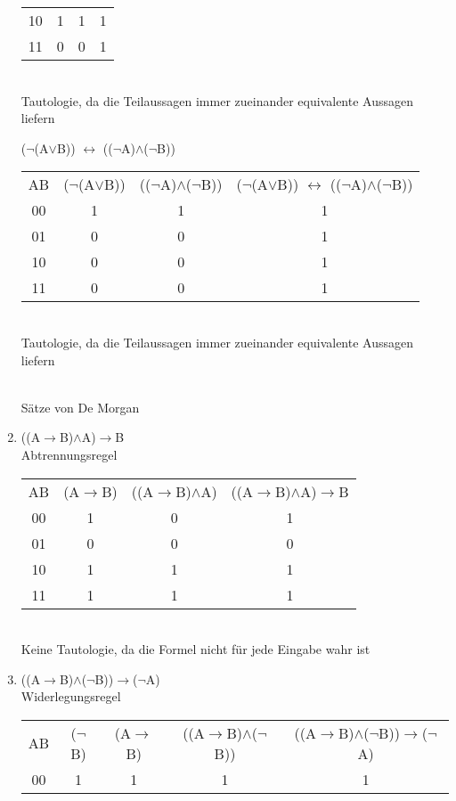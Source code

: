 \begin{enumerate}
{\begin{tabular}{cccc}
            10 & 1 & 1 & 1 \\
            11 & 0 & 0 & 1 \\
        \end{tabular}
        \\
        Tautologie, da die Teilaussagen immer zueinander equivalente Aussagen liefern\\
        }
        ($\neg$(A$\vee$B)) $\leftrightarrow$ (($\neg$A)$\wedge$($\neg$B)) \\
        {\tiny
        \begin{tabular}{cccc}
            AB & ($\neg$(A$\vee$B)) & (($\neg$A)$\wedge$($\neg$B)) &
            ($\neg$(A$\vee$B)) $\leftrightarrow$ (($\neg$A)$\wedge$($\neg$B))\\
            00 & 1 & 1 & 1\\
            01 & 0 & 0 & 1\\
            10 & 0 & 0 & 1\\
            11 & 0 & 0 & 1\\
        \end{tabular}
        \\
        Tautologie, da die Teilaussagen immer zueinander equivalente Aussagen liefern}\\
        Sätze von De Morgan
    \item ((A$\to$B)$\wedge$A)$\to$B \\ Abtrennungsregel\\
    {\tiny
    \begin{tabular}{cccc}
        AB & (A$\to$B) & ((A$\to$B)$\wedge$A) & ((A$\to$B)$\wedge$A)$\to$B\\
        00 & 1 & 0 & 1\\
        01 & 0 & 0 & 0\\
        10 & 1 & 1 & 1\\
        11 & 1 & 1 & 1\\
    \end{tabular}
    \\Keine Tautologie, da die Formel nicht für jede Eingabe wahr ist}
    \item ((A$\to$B)$\wedge$($\neg$B))$\to$($\neg$A) \\ Widerlegungsregel\\
    {\tiny
    \begin{tabular}{ccccc}
        AB & ($\neg$B) & (A$\to$B) & ((A$\to$B)$\wedge$($\neg$B)) & 
        ((A$\to$B)$\wedge$($\neg$B))$\to$($\neg$A)\\
        00 & 1 & 1 & 1 & 1\\

\end{tabular}}
\end{enumerate}
